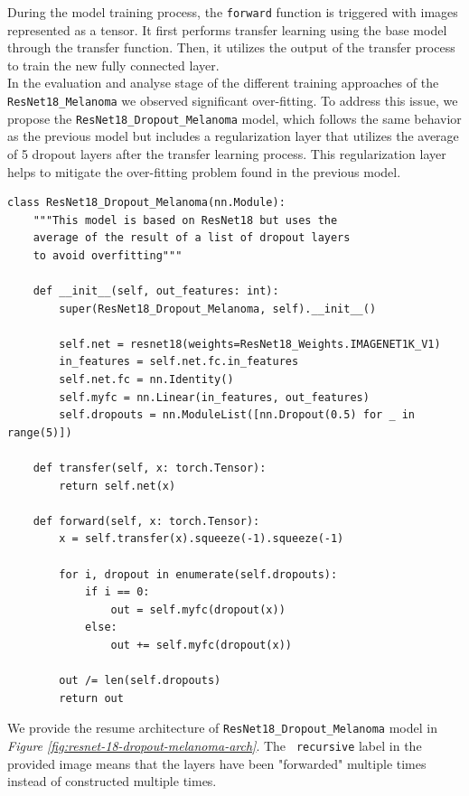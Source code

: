 During the model training process, the {\tt forward} function is triggered with
images represented as a tensor. It first performs transfer learning using the
base model through the transfer function. Then, it utilizes the output of the
transfer process to train the new fully connected layer. \\

In the evaluation and analyse stage of the different training approaches of the
{\tt ResNet18\_Melanoma} we observed significant over-fitting. To address this
issue, we propose the {\tt ResNet18\_Dropout\_Melanoma} model, which follows
the same behavior as the previous model but includes a regularization layer
that utilizes the average of 5 dropout layers after the transfer learning
process. This regularization layer helps to mitigate the over-fitting problem
found in the previous model.

\begin{Verbatim}[fontsize=\scriptsize]
class ResNet18_Dropout_Melanoma(nn.Module):
    """This model is based on ResNet18 but uses the
    average of the result of a list of dropout layers
    to avoid overfitting"""

    def __init__(self, out_features: int):
        super(ResNet18_Dropout_Melanoma, self).__init__()

        self.net = resnet18(weights=ResNet18_Weights.IMAGENET1K_V1)
        in_features = self.net.fc.in_features
        self.net.fc = nn.Identity()
        self.myfc = nn.Linear(in_features, out_features)
        self.dropouts = nn.ModuleList([nn.Dropout(0.5) for _ in range(5)])

    def transfer(self, x: torch.Tensor):
        return self.net(x)

    def forward(self, x: torch.Tensor):
        x = self.transfer(x).squeeze(-1).squeeze(-1)

        for i, dropout in enumerate(self.dropouts):
            if i == 0:
                out = self.myfc(dropout(x))
            else:
                out += self.myfc(dropout(x))

        out /= len(self.dropouts)
        return out
\end{Verbatim}

We provide the resume architecture of {\tt ResNet18\_Dropout\_Melanoma} model
in \textit{Figure \ref{fig:resnet-18-dropout-melanoma-arch}}. The {\tt
recursive} label in the provided image means that the layers have been
"forwarded" multiple times instead of constructed multiple times.

